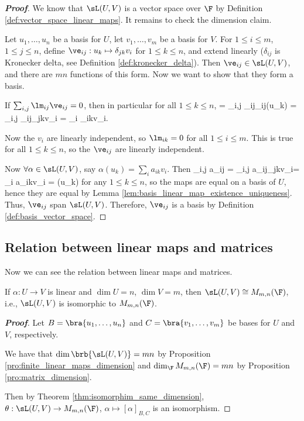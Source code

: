 \begin{proof}[\bf Proof]
We know that $\sL(U, V )$ is a vector space over $\F$ by Definition \ref{def:vector_space_linear_maps}. It remains to check the dimension claim.

Let $u_1, \dots, u_n$ be a basis for $U$, let $v_1, \dots, v_m$ be a basis for $V$. For $1 \leq  i \leq  m$, $1 \leq  j \leq  n$, define $\ve_{ij} : u_k \mapsto \delta_{jk}v_i$ for $1 \leq  k \leq  n$, and extend linearly ($\delta_{ij}$ is Kronecker delta, see Definition \ref{def:kronecker_delta}). Then $\ve_{ij} \in \sL(U, V)$, and there are $mn$ functions of this form. Now we want to show that they form a basis.

If $\sum_{i,j} \lm_{ij}\ve_{ij} = 0$, then in particular for all $1 \leq  k \leq  n$,
 = \sum_{i,j} \lm_{ij}\ve_{ij}(u_k) = \sum_{i,j} \lm_{ij}\delta_{jk}v_i = \sum_i \lm_{ik}v_i.
\ee

Now the $v_i$ are linearly independent, so $\lm_{ik} = 0$ for all $1 \leq  i \leq  m$. This is true for all $1 \leq  k \leq  n$, so the $\ve_{ij}$ are linearly independent.

Now $\forall \alpha \in\sL(U, V)$, say $\alpha(u_k) = \sum_i a_{ik} v_i$. Then
\be%
\sum_{i,j} a_{ij} = \sum_{i,j} a_{ij}\delta_{jk}v_i= \sum_i a_{ik}v_i = \alpha(u_k)
\ee
for any $1 \leq  k \leq  n$, so the maps are equal on a basis of $U$, hence they are equal by Lemma \ref{lem:basis_linear_map_existence_uniqueness}. Thus, $\ve_{ij}$ span $\sL(U,V)$. Therefore, $\ve_{ij}$ is a basis by Definition \ref{def:basis_vector_space}.
\end{proof}

\subsection{Relation between linear maps and matrices}

Now we can see the relation between linear maps and matrices.

\begin{proposition}\label{pro:relation_linear_map_matrix}
If $\alpha : U \to V$ is linear and $\dim U = n$, $\dim V = m$, then $\sL(U, V) \cong M_{m,n}(\F)$, i.e., $\sL(U, V)$ is isomorphic to $M_{m,n}(\F)$.
\end{proposition}

\begin{proof}[\bf Proof]
Let $B = \bra{u_1, \dots, u_n}$ and $C = \bra{v_1, \dots, v_m}$ be bases for $U$ and $V$, respectively.

We have that $\dim \brb{\sL(U,V)} = mn$ by Proposition \ref{pro:finite_linear_maps_dimension} and $\dim_\F M_{m,n}(\F) = mn$ by Proposition \ref{pro:matrix_dimension}.

Then by Theorem \ref{thm:isomorphim_same_dimension}, $\theta : \sL(U, V) \to M_{m,n}(\F)$, $\alpha \mapsto [\alpha]_{B,C}$ is an isomorphism.
\end{proof}

